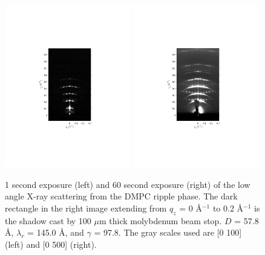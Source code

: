 \begin{figure}
  \centering
  \includegraphics[trim=160 180 160 180,clip,width=0.49\textwidth]{figures/ripple/ripple083}
  \includegraphics[trim=160 180 160 180,clip,width=0.49\textwidth]{figures/ripple/ripple085}
  \caption{1 second exposure (left) and 60 second exposure (right) of the low
  angle X-ray scattering from the DMPC ripple phase. The dark rectangle 
  in the right image extending from $q_z$ = 0 \AA$^{-1}$ to 0.2 \AA$^{-1}$
  is the shadow cast by 100 $\mu$m thick molybdenum beam stop.
  $D$ = 57.8 \AA, $\lambda_r$ = 145.0 \AA, and $\gamma$ = 97.8\textdegree.
  The gray scales used are [0 100] (left) and [0 500] (right).}
  \label{fig:ripple_laxs_images}  
\end{figure} 

